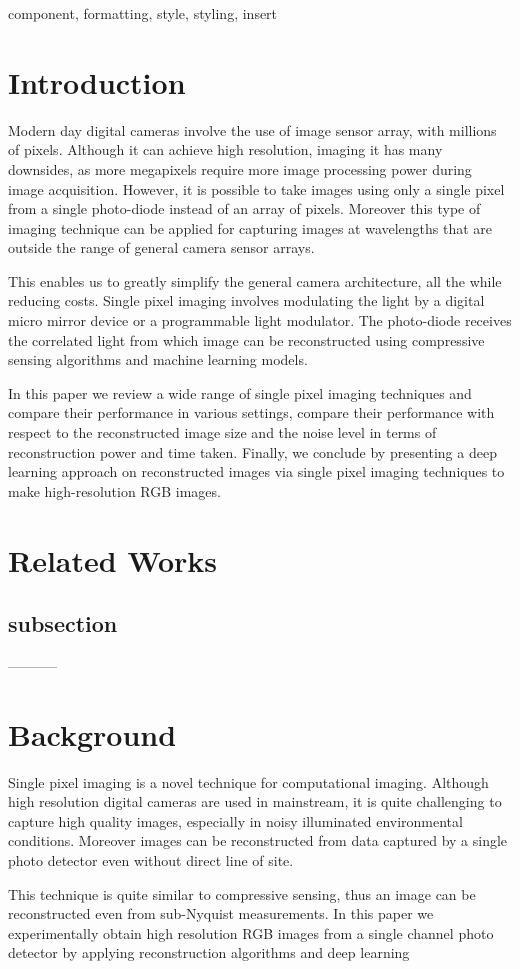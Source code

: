 \documentclass[conference]{IEEEtran}
\begin{document}
\begin{IEEEkeywords}
component, formatting, style, styling, insert
\end{IEEEkeywords}

\section{Introduction}
Modern day digital cameras involve the use of image sensor array, with millions of pixels. Although it can achieve high resolution, imaging it has many downsides, as more megapixels require more image processing power during image acquisition. However, it is possible to take images using only a single pixel from a single photo-diode instead of an array of pixels. Moreover this type of imaging technique can be applied for capturing images at wavelengths that are outside the range of general camera sensor arrays.\par
This enables us to greatly simplify the general camera architecture, all the while reducing costs. Single pixel imaging involves modulating the light by a digital micro mirror device or a programmable light modulator. The photo-diode receives the correlated light from which image can be reconstructed using compressive sensing algorithms and machine learning models.\par
In this paper we review a wide range of single pixel imaging techniques and compare their performance in various settings, compare their performance with respect to the reconstructed image size and the noise level in terms of reconstruction power and time taken. Finally, we conclude by presenting a deep learning approach on reconstructed images via single pixel imaging techniques to make high-resolution RGB images.

\section{Related Works}

\subsection{subsection}
-----------
\section{Background}
Single pixel imaging is a novel technique for computational imaging. Although high resolution digital cameras are used in mainstream, it is quite challenging to capture high quality images, especially in noisy illuminated environmental conditions. Moreover images can be reconstructed from data captured by a single photo detector even without direct line of site.\par
This technique is quite similar to compressive sensing, thus an image can be reconstructed even from sub-Nyquist measurements.
In this paper we experimentally obtain high resolution RGB images from a single channel photo detector by applying reconstruction algorithms and deep learning\par
\end{document}
